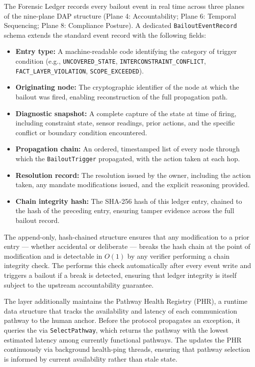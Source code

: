 The Forensic Ledger records every bailout event in real time across three planes of the nine-plane DAP structure (Plane 4: Accountability; Plane 6: Temporal Sequencing; Plane 8: Compliance Posture). A dedicated \texttt{BailoutEventRecord} schema extends the standard event record with the following fields:

\begin{itemize}
\item \textbf{Entry type:} A machine-readable code identifying the category of trigger condition (e.g., \texttt{UNCOVERED\_STATE}, \texttt{INTERCONSTRAINT\_CONFLICT}, \texttt{FACT\_LAYER\_VIOLATION}, \texttt{SCOPE\_EXCEEDED}).
\item \textbf{Originating node:} The cryptographic identifier of the \bounds{} node at which the bailout was fired, enabling reconstruction of the full propagation path.
\item \textbf{Diagnostic snapshot:} A complete capture of the \bounds{} state at time of firing, including constraint state, sensor readings, prior actions, and the specific conflict or boundary condition encountered.
\item \textbf{Propagation chain:} An ordered, timestamped list of every node through which the \texttt{BailoutTrigger} propagated, with the action taken at each hop.
\item \textbf{Resolution record:} The resolution issued by the \purpose{} owner, including the action taken, any mandate modifications issued, and the explicit reasoning provided.
\item \textbf{Chain integrity hash:} The SHA-256 hash of this ledger entry, chained to the hash of the preceding entry, ensuring tamper evidence across the full bailout record.
\end{itemize}

The append-only, hash-chained structure ensures that any modification to a prior entry — whether accidental or deliberate — breaks the hash chain at the point of modification and is detectable in $O(1)$ by any verifier performing a chain integrity check. The \fact{} performs this check automatically after every event write and triggers a bailout if a break is detected, ensuring that ledger integrity is itself subject to the upstream accountability guarantee.

The \fact{} layer additionally maintains the Pathway Health Registry (PHR), a runtime data structure that tracks the availability and latency of each communication pathway to the human anchor. Before the protocol propagates an exception, it queries the \fact{} via \texttt{SelectPathway}, which returns the pathway with the lowest estimated latency among currently functional pathways. The \fact{} updates the PHR continuously via background health-ping threads, ensuring that pathway selection is informed by current availability rather than stale state.

